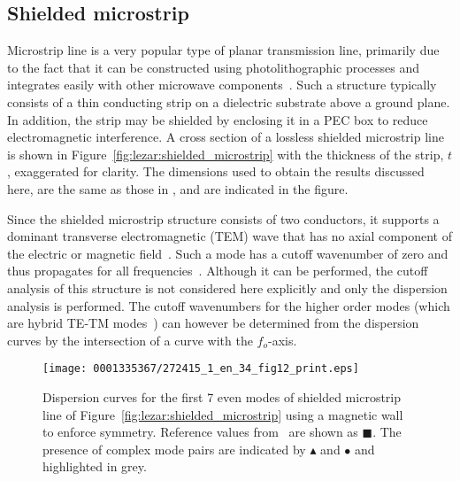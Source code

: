 \subsection{Shielded microstrip}
\label{lezar:sec:shielded_microstrip}

Microstrip line is a very popular type of planar transmission
line, primarily due to the fact that it can be constructed using
photolithographic processes and integrates easily with other microwave
components~\citep{Pozar2005}. Such a structure typically consists of a
thin conducting strip on a dielectric substrate above a ground plane. In
addition, the strip may be shielded by enclosing it in a PEC box to reduce
electromagnetic interference. A cross section of a lossless shielded
microstrip line is shown in Figure~\ref{fig:lezar:shielded_microstrip}
with the thickness of the strip, $t$, exaggerated for clarity. The
dimensions used to obtain the results discussed here, are the same as
those in \citet{PelosiCoccioliSelleri1998}, and are indicated in the figure.

\enlargethispage{12pt}

Since the shielded microstrip structure consists of two
conductors, it supports a dominant transverse electromagnetic
(TEM) wave that has no axial component of the electric or
magnetic field~\citep{Pozar2005}. Such a mode has a cutoff
wavenumber of zero and thus propagates for all
frequencies~\citep{Jin2002,PelosiCoccioliSelleri1998}. Although it can
be performed, the cutoff analysis of this structure is not considered
here explicitly and only the dispersion analysis is performed. The
cutoff wavenumbers for the higher order modes (which are hybrid TE-TM
modes~\citep{Pozar2005}) can however be determined from the dispersion
curves by the intersection of a curve with the $f_o$-axis.


\begin{figure}[!t]
 \centering
 \texttt{[image: 0001335367/272415\_1\_en\_34\_fig12\_print.eps]}
 \caption{Dispersion curves for the first 7 even modes of shielded
 microstrip line of Figure~\ref{fig:lezar:shielded_microstrip}
 using a magnetic wall to enforce symmetry. Reference values
 from~\citet{PelosiCoccioliSelleri1998} are shown as $\blacksquare$. The
 presence of complex mode pairs are indicated by $\blacktriangle$ and
 $\bullet$ and highlighted in grey.}
 \label{fig:lezar:shielded_microstrip_dispersion_curves}
\end{figure}
\label{lezar:sec:shielded_microstrip|)}

